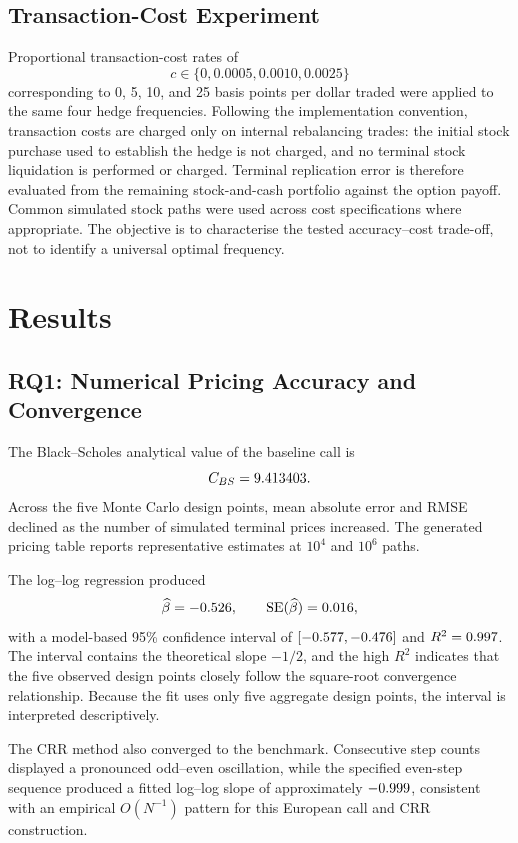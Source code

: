 \documentclass[11pt,a4paper]{article}
\begin{document}
\subsection{Transaction-Cost Experiment}

Proportional transaction-cost rates of
\[
c\in\{0,0.0005,0.0010,0.0025\}
\]
corresponding to 0, 5, 10, and 25 basis points per dollar traded were applied to the same four hedge frequencies. Following the implementation convention, transaction costs are charged only on internal rebalancing trades: the initial stock purchase used to establish the hedge is not charged, and no terminal stock liquidation is performed or charged. Terminal replication error is therefore evaluated from the remaining stock-and-cash portfolio against the option payoff. Common simulated stock paths were used across cost specifications where appropriate. The objective is to characterise the tested accuracy--cost trade-off, not to identify a universal optimal frequency.

\section{Results}

\subsection{RQ1: Numerical Pricing Accuracy and Convergence}

The Black--Scholes analytical value of the baseline call is
\[
C_{BS}=9.413403.
\]
Across the five Monte Carlo design points, mean absolute error and RMSE declined as the number of simulated terminal prices increased. The generated pricing table reports representative estimates at $10^4$ and $10^6$ paths.

The log--log regression produced
\[
\widehat\beta=-0.526,\qquad \operatorname{SE}(\widehat\beta)=0.016,
\]
with a model-based 95\% confidence interval of $[-0.577,-0.476]$ and $R^2=0.997$. The interval contains the theoretical slope $-1/2$, and the high $R^2$ indicates that the five observed design points closely follow the square-root convergence relationship. Because the fit uses only five aggregate design points, the interval is interpreted descriptively.

The CRR method also converged to the benchmark. Consecutive step counts displayed a pronounced odd--even oscillation, while the specified even-step sequence produced a fitted log--log slope of approximately $-0.999$, consistent with an empirical $O(N^{-1})$ pattern for this European call and CRR construction.
\end{document}
